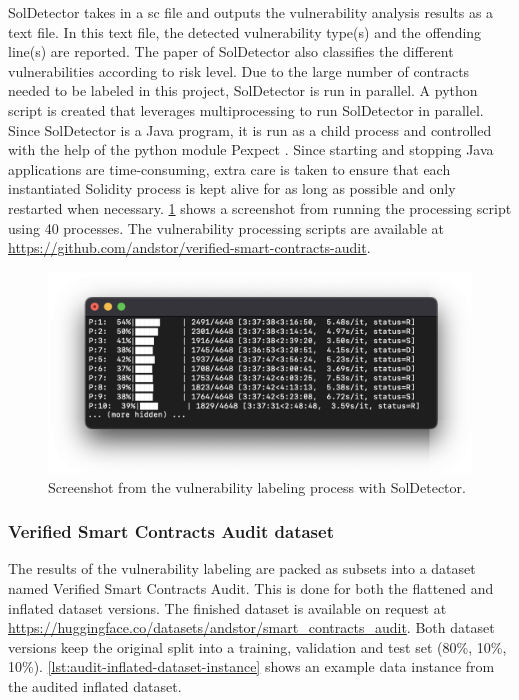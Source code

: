 SolDetector takes in a \acrshort{sc} file and outputs the vulnerability analysis results as a text file. In this text file, the detected vulnerability type(s) and the offending line(s) are reported. The paper \cite{soldetector} of SolDetector also classifies the different vulnerabilities according to risk level. Due to the large number of contracts needed to be labeled in this project, SolDetector is run in parallel. A python script is created that leverages multiprocessing to run SolDetector in parallel. Since SolDetector is a Java program, it is run as a child process and controlled with the help of the python module Pexpect \cite{pexpect}. Since starting and stopping Java applications are time-consuming, extra care is taken to ensure that each instantiated Solidity process is kept alive for as long as possible and only restarted when necessary. \cref{fig:solidetector-vulnerability-labeling} shows a screenshot from running the processing script using 40 processes. The vulnerability processing scripts are available at \url{https://github.com/andstor/verified-smart-contracts-audit}.

\begin{figure}
    \centering
    \includegraphics[width=\textwidth]{figures/solidetector-run.png}
    \caption{Screenshot from the vulnerability labeling process with SolDetector.}
    \label{fig:solidetector-vulnerability-labeling}
\end{figure}

\subsubsection{Verified Smart Contracts Audit dataset}
\label{sec:verified-smart-contracts-audit}
The results of the vulnerability labeling are packed as subsets into a dataset named Verified Smart Contracts Audit. This is done for both the flattened and inflated dataset versions. The finished dataset is available on request at \url{https://huggingface.co/datasets/andstor/smart_contracts_audit}. Both dataset versions keep the original split into a training, validation and test set (80\%, 10\%, 10\%). \cref{lst:audit-inflated-dataset-instance} shows an example data instance from the audited inflated dataset.

